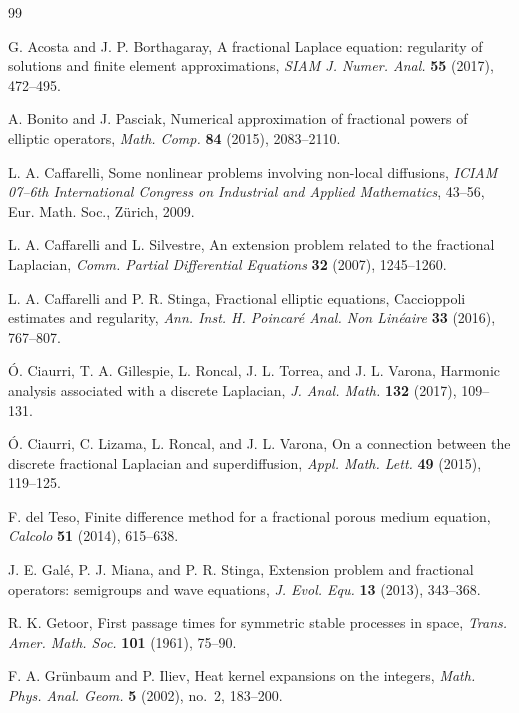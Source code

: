 \documentclass[a4paper,11pt,reqno]{amsart}
\theoremstyle{definition}
\numberwithin{equation}{section}
\begin{document}
\begin{thebibliography}{99}

G. Acosta and J. P. Borthagaray,
{A fractional Laplace equation: regularity of solutions and finite element approximations},
\textit{SIAM J. Numer. Anal.}
\textbf{55} (2017), 472--495.

A. Bonito and J. Pasciak,
{Numerical approximation of fractional powers of elliptic operators},
\textit{Math. Comp.}
\textbf{84} (2015), 2083--2110.

L. A. Caffarelli,
{Some nonlinear problems involving non-local diffusions},
\textit{ICIAM 07--6th International Congress on Industrial and Applied Mathematics},
43--56,
Eur. Math. Soc., Z\"urich, 2009.

L. A. Caffarelli and L. Silvestre,
{An extension problem related to the fractional Laplacian},
\textit{Comm. Partial Differential Equations}
\textbf{32} (2007), 1245--1260.

L. A. Caffarelli and P. R. Stinga,
{Fractional elliptic equations, Caccioppoli estimates and regularity},
\textit{Ann. Inst. H. Poincar\'e Anal. Non Lin\'eaire}
\textbf{33} (2016), 767--807.

\'O. Ciaurri, T. A. Gillespie, L. Roncal, J. L. Torrea, and J. L. Varona,
{Harmonic analysis associated with a discrete Laplacian},
\textit{J. Anal. Math.}
\textbf{132} (2017), 109--131.

\'O. Ciaurri, C. Lizama, L. Roncal, and J. L. Varona,
{On a connection between the discrete fractional Laplacian and superdiffusion},
\textit{Appl. Math. Lett.}
\textbf{49} (2015), 119--125.

F. del Teso,
{Finite difference method for a fractional porous medium equation},
\textit{Calcolo}
\textbf{51} (2014), 615--638.

J. E. Gal\'e, P. J. Miana, and P. R. Stinga,
{Extension problem and fractional operators: semigroups and wave equations},
\textit{J. Evol. Equ.}
\textbf{13} (2013), 343--368.

R. K. Getoor,
{First passage times for symmetric stable processes in space},
\textit{Trans. Amer. Math. Soc.}
\textbf{101} (1961), 75--90.

F. A. Gr\"unbaum and P. Iliev,
{Heat kernel expansions on the integers},
\textit{Math. Phys. Anal. Geom.}
\textbf{5} (2002), no.~2, 183--200.


\end{thebibliography}
\end{document}

